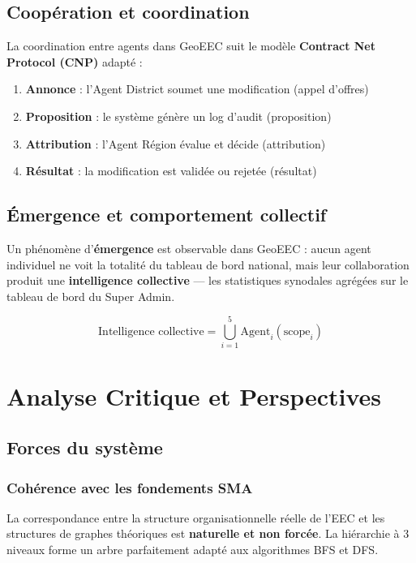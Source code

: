 \documentclass[12pt, a4paper]{report}
\theoremstyle{definition}
\begin{document}
\section{Coopération et coordination}

La coordination entre agents dans GeoEEC suit le modèle \textbf{Contract Net Protocol (CNP)} adapté :

\begin{enumerate}
  \item \textbf{Annonce} : l'Agent District soumet une modification (appel d'offres)
  \item \textbf{Proposition} : le système génère un log d'audit (proposition)
  \item \textbf{Attribution} : l'Agent Région évalue et décide (attribution)
  \item \textbf{Résultat} : la modification est validée ou rejetée (résultat)
\end{enumerate}

\section{Émergence et comportement collectif}

Un phénomène d'\textbf{émergence} est observable dans GeoEEC : aucun agent individuel ne voit la totalité du tableau de bord national, mais leur collaboration produit une \textbf{intelligence collective} — les statistiques synodales agrégées sur le tableau de bord du Super Admin.

$$\text{Intelligence collective} = \bigcup_{i=1}^{5} \text{Agent}_i(\text{scope}_i)$$

\chapter{Analyse Critique et Perspectives}

\section{Forces du système}

\subsection{Cohérence avec les fondements SMA}
La correspondance entre la structure organisationnelle réelle de l'EEC et les structures de graphes théoriques est \textbf{naturelle et non forcée}. La hiérarchie à 3 niveaux forme un arbre parfaitement adapté aux algorithmes BFS et DFS.
\end{document}
